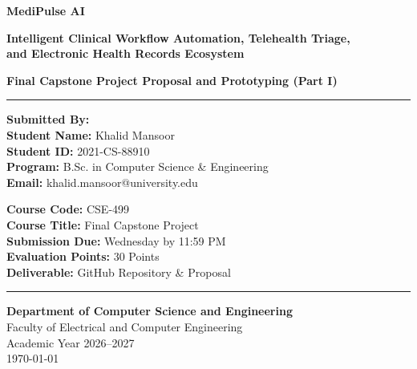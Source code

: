 \documentclass[11pt,a4paper]{article}
\begin{document}
\begin{titlepage}
    \centering
    \vspace*{1cm}
    
    {\Huge \bfseries \color{primaryblue} MediPulse AI\par}
    \vspace{0.4cm}
    {\Large \bfseries Intelligent Clinical Workflow Automation, Telehealth Triage, \\ and Electronic Health Records Ecosystem\par}
    \vspace{0.8cm}
    {\large \textbf{Final Capstone Project Proposal and Prototyping (Part I)}\par}
    
    \vspace{1.5cm}
    \rule{\linewidth}{1.2pt}
    \vspace{0.5cm}
    
    \begin{minipage}{0.5\textwidth}
        \begin{flushleft} \large
            \textbf{Submitted By:}\\
            \textbf{Student Name:} Khalid Mansoor\\
            \textbf{Student ID:} 2021-CS-88910\\
            \textbf{Program:} B.Sc. in Computer Science \& Engineering\\
            \textbf{Email:} khalid.mansoor@university.edu
        \end{flushleft}
    \end{minipage}
    \begin{minipage}{0.48\textwidth}
        \begin{flushright} \large
            \textbf{Course Code:} CSE-499\\
            \textbf{Course Title:} Final Capstone Project\\
            \textbf{Submission Due:} Wednesday by 11:59 PM\\
            \textbf{Evaluation Points:} 30 Points\\
            \textbf{Deliverable:} GitHub Repository \& Proposal
        \end{flushright}
    \end{minipage}
    
    \vspace{1.5cm}
    \rule{\linewidth}{1.2pt}
    
    \vfill
    
    \textbf{Department of Computer Science and Engineering}\\
    Faculty of Electrical and Computer Engineering\\
    Academic Year 2026--2027\\[0.5cm]
    \today
\end{titlepage}
\end{document}
